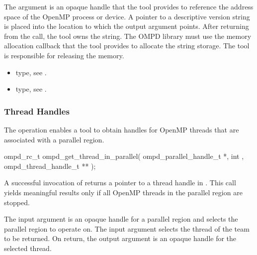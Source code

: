 \argdesc
The  argument is an opaque handle that the tool provides
to reference the address space of the OpenMP process or device. A pointer to 
a descriptive version string is placed into the location to which the 
 output argument points. After returning from the call, the tool 
owns the string. The OMPD library must use the memory allocation callback that 
the tool provides to allocate the string storage. The tool is responsible 
for releasing the memory.

\crossreferences
\begin{itemize}
\item {} type, 
see .

\item {} type, see .
\end{itemize}



\subsubsection{Thread Handles}



\label{subsubsubsec:ompd_get_thread_in_parallel}

\summary
The   operation enables a tool to obtain 
handles for OpenMP threads that are associated with a parallel region.

\format
\begin{cspecific}
\begin{ompSyntax}
ompd_rc_t ompd_get_thread_in_parallel(
  ompd_parallel_handle_t *,
  int ,
  ompd_thread_handle_t **
);
\end{ompSyntax}
\end{cspecific}


\descr
A successful invocation of   returns a pointer to
a thread handle in .
This call yields meaningful results only if all OpenMP threads in the parallel
region are stopped.

\argdesc
The input argument  is an opaque handle for a parallel region
 and selects the parallel region to operate on.
The input argument  selects the thread of the team to be returned.
On return, the output argument  is an opaque handle for the selected thread.

